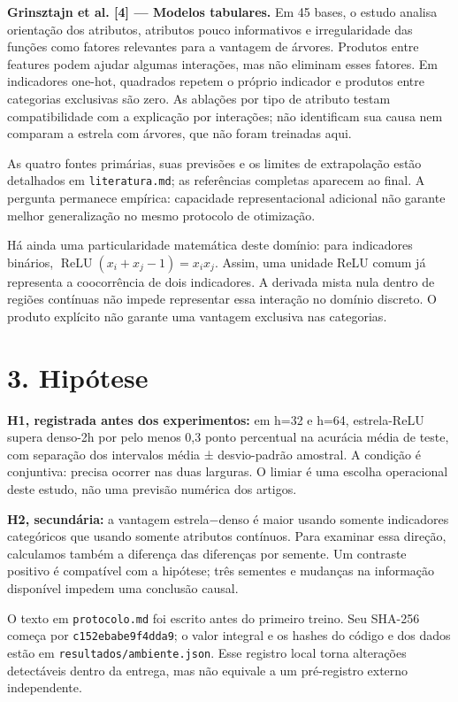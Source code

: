 \documentclass[10pt,a4paper]{article}
\begin{document}
\textbf{Grinsztajn et al. [4] — Modelos tabulares.} Em 45 bases, o estudo analisa orientação dos atributos, atributos pouco informativos e irregularidade das funções como fatores relevantes para a vantagem de árvores. Produtos entre features podem ajudar algumas interações, mas não eliminam esses fatores. Em indicadores one-hot, quadrados repetem o próprio indicador e produtos entre categorias exclusivas são zero. As ablações por tipo de atributo testam compatibilidade com a explicação por interações; não identificam sua causa nem comparam a estrela com árvores, que não foram treinadas aqui.


As quatro fontes primárias, suas previsões e os limites de extrapolação estão detalhados em \texttt{literatura.md}; as referências completas aparecem ao final. A pergunta permanece empírica: capacidade representacional adicional não garante melhor generalização no mesmo protocolo de otimização.


Há ainda uma particularidade matemática deste domínio: para indicadores binários, \(\operatorname{ReLU}(x_i+x_j-1)=x_i x_j\). Assim, uma unidade ReLU comum já representa a coocorrência de dois indicadores. A derivada mista nula dentro de regiões contínuas não impede representar essa interação no domínio discreto. O produto explícito não garante uma vantagem exclusiva nas categorias.


\clearpage

\section*{3. Hipótese}
\textbf{H1, registrada antes dos experimentos:} em h=32 e h=64, estrela-ReLU supera denso-2h por pelo menos 0,3 ponto percentual na acurácia média de teste, com separação dos intervalos média ± desvio-padrão amostral. A condição é conjuntiva: precisa ocorrer nas duas larguras. O limiar é uma escolha operacional deste estudo, não uma previsão numérica dos artigos.


\textbf{H2, secundária:} a vantagem estrela−denso é maior usando somente indicadores categóricos que usando somente atributos contínuos. Para examinar essa direção, calculamos também a diferença das diferenças por semente. Um contraste positivo é compatível com a hipótese; três sementes e mudanças na informação disponível impedem uma conclusão causal.


O texto em \texttt{protocolo.md} foi escrito antes do primeiro treino. Seu SHA-256 começa por \texttt{c152ebabe9f4dda9}; o valor integral e os hashes do código e dos dados estão em \texttt{resultados/\allowbreak{}ambiente.json}. Esse registro local torna alterações detectáveis dentro da entrega, mas não equivale a um pré-registro externo independente.
\end{document}
